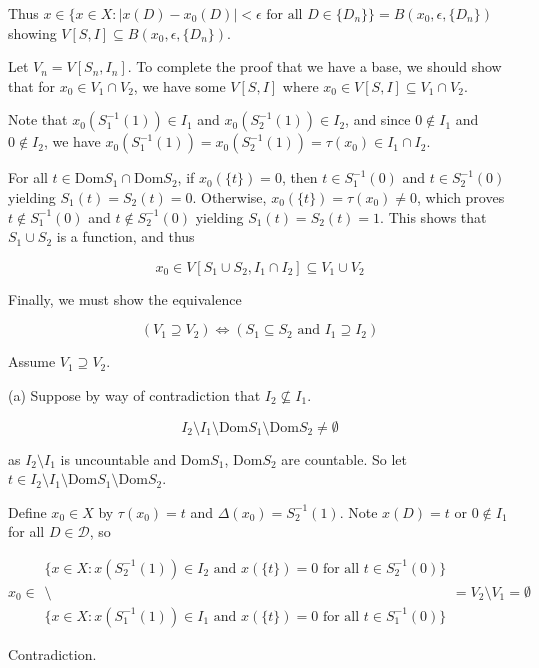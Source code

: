 \documentclass[12pt]{article}
\theoremstyle{plain}
\theoremstyle{definition}
\theoremstyle{remark}
\begin{document}
Thus $x \in \{x\in X: |x(D)-x_0(D)| < \epsilon \text{ for all } D \in \{D_n\}\} = B(x_0,\epsilon,\{D_n\})$ showing $V[S,I] \subseteq B(x_0,\epsilon,\{D_n\})$.

Let $V_n = V[S_n,I_n]$. To complete the proof that we have a base, we should show that for $x_0 \in V_1 \cap V_2$, we have some $V[S,I]$ where $x_0 \in V[S,I] \subseteq V_1 \cap V_2$.

Note that $x_0(S_1^{-1}(1)) \in I_1$ and $x_0(S_2^{-1}(1)) \in I_2$, and since $0 \not\in I_1$ and $0 \not\in I_2$, we have $x_0(S_1^{-1}(1))=x_0(S_2^{-1}(1))=\tau(x_0)\in I_1 \cap I_2$.

For all $t\in \textrm{Dom}S_1 \cap \textrm{Dom}S_2$, if $x_0(\{t\})=0$, then $t\in S_1^{-1}(0)$ and $t\in S_2^{-1}(0)$ yielding $S_1(t)=S_2(t)=0$. Otherwise, $x_0(\{t\})=\tau(x_0)\not=0$, which proves $t\not\in S_1^{-1}(0)$ and $t\not\in S_2^{-1}(0)$ yielding $S_1(t)=S_2(t)=1$.  This shows that $S_1 \cup S_2$ is a function, and thus

\[
x_0 \in V[S_1\cup S_2, I_1 \cap I_2] \subseteq V_1 \cup V_2
\]

Finally, we must show the equivalence

\[(V_1 \supseteq V_2) \Leftrightarrow (S_1 \subseteq S_2 \text{ and } I_1 \supseteq I_2)\]

Assume $V_1 \supseteq V_2$.

(a) Suppose by way of contradiction that $I_2 \not\subseteq I_1$.

\[
I_2 \setminus I_1 \setminus \textrm{Dom} S_1 \setminus \textrm{Dom} S_2 \not= \emptyset
\]

as $I_2\setminus I_1$ is uncountable and $\textrm{Dom} S_1$, $\textrm{Dom} S_2$ are countable. So let $t \in I_2 \setminus I_1 \setminus \textrm{Dom} S_1 \setminus \textrm{Dom} S_2$.

Define $x_0 \in X$ by $\tau(x_0) = t$ and $\Delta(x_0) = S^{-1}_2(1)$. Note $x(D)= t$ or $0 \not\in I_1$ for all $D \in \mathcal{D}$, so

\[
x_0 \in
\begin{array}{c}
\{ x\in X : x(S^{-1}_2(1)) \in I_2 \text{ and } x(\{t\})=0 \text{ for all } t \in S_2^{-1}(0)\}
\\
\setminus
\\
\{ x\in X : x(S^{-1}_1(1)) \in I_1 \text{ and } x(\{t\})=0 \text{ for all } t \in S_1^{-1}(0)\}
\end{array}
= V_2 \setminus V_1 = \emptyset
\]

Contradiction.
\end{document}
